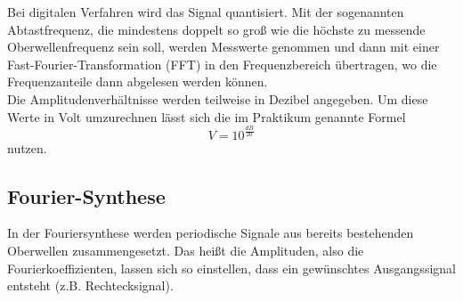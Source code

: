\noindent Bei digitalen Verfahren wird das Signal quantisiert. Mit der sogenannten
Abtastfrequenz, die mindestens doppelt so groß wie die höchste zu messende Oberwellenfrequenz sein soll,
werden Messwerte genommen und dann mit einer Fast-Fourier-Transformation (FFT) in den
Frequenzbereich übertragen, wo die Frequenzanteile dann abgelesen werden können.\\

\noindent Die Amplitudenverhältnisse werden teilweise in Dezibel angegeben. Um diese Werte in Volt umzurechnen lässt sich die im Praktikum genannte Formel
\begin{equation}
  V=10^{\frac{dB}{20}}
\end{equation}
nutzen.
\subsection{Fourier-Synthese}
In der Fouriersynthese werden periodische Signale aus bereits bestehenden
Oberwellen zusammengesetzt. Das heißt die Amplituden, also die
Fourierkoeffizienten, lassen sich so einstellen, dass ein gewünschtes
Ausgangssignal entsteht (z.B. Rechtecksignal). \cite{V351}